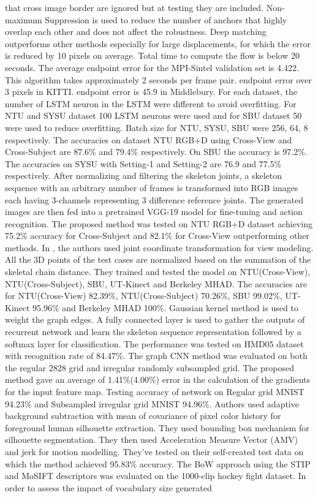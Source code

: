 \documentclass[11pt,english]{article}
\begin{document}
that cross image border are ignored but at testing they are included. Non-maximum Suppression is used to reduce the number of anchors that highly overlap each other and does not affect the robustness. \citep{weinzaepfel2013deepflow} Deep matching outperforms other methods especially for large displacements, for which the error is reduced by 10 pixels on average. Total time to compute the flow is below 20 seconds. The average endpoint error for the MPI-Sintel validation set is 4.422. This algorithm takes approximately 2 seconds per frame pair. endpoint error over 3 pixels in KITTI. endpoint error is 45.9 in Middlebury. \citep{zhang2017view} For each dataset, the number of LSTM neuron in the LSTM were different to avoid overfitting. For NTU and SYSU dataset 100 LSTM neurons were used and for SBU dataset 50 were used to reduce overfitting. Batch size for NTU, SYSU, SBU were 256, 64, 8 respectively. The accuracies on dataset NTU RGB+D using Cross-View and Cross-Subject are 87.6\% and 79.4\% respectively. On SBU the accuracy is 97.2\%. The accuracies on SYSU with Setting-1 and Setting-2 are 76.9 and 77.5\% respectively. \citep{li2017end} After normalizing and filtering the skeleton joints, a skeleton sequence with an arbitrary number of frames is transformed into RGB images each having 3-channels representing 3 difference reference joints. The generated images are then fed into a pretrained VGG-19 model for fine-tuning and action recognition. The proposed method was tested on NTU RGB+D dataset achieving 75.2\% accuracy for Cross-Subject and 82.1\% for Cross-View outperforming other methods. In \citep{zhang2017geometric}, the authors used joint coordinate transformation for view modeling. All the 3D points of the test cases are normalized based on the summation of the skeletal chain distance. They trained and tested the model on NTU(Cross-View), NTU(Cross-Subject), SBU, UT-Kinect and Berkeley MHAD. The accuracies are for NTU(Cross-View) 82.39\%, NTU(Cross-Subject) 70.26\%, SBU 99.02\%, UT-Kinect 95.96\% and Berkeley MHAD 100\%. \citep{li2018action} Gaussian kernel method is used to weight the graph edges. A fully connected layer is used to gather the outputs of recurrent network and learn the skeleton sequence representation followed by a softmax layer for classification. The performance was tested on HMD05 dataset with recognition rate of 84.47\%. \citep{edwards2016graph} The graph CNN method was evaluated on both the regular 2828 grid and irregular randomly subsampled grid. The proposed method gave an average of 1.41\%(4.00\%) error in the calculation of the gradients for the input feature map. Testing accuracy of network on Regular grid MNIST 94.23\% and Subsampled irregular grid MNIST 94.96\%. \citep{datta2002person} Authors used adaptive background subtraction with mean of covariance of pixel color history for foreground human silhouette extraction. They used bounding box mechanism for silhouette segmentation. They then used Acceleration Measure Vector (AMV) and jerk for motion modelling. They’ve tested on their self-created test data on which the method achieved 95.83\% accuracy. \citep{nievas2011violence} The BoW approach using the STIP and MoSIFT descriptors was evaluated on the 1000-clip hockey fight dataset. In order to assess the impact of vocabulary size generated 
\end{document}
